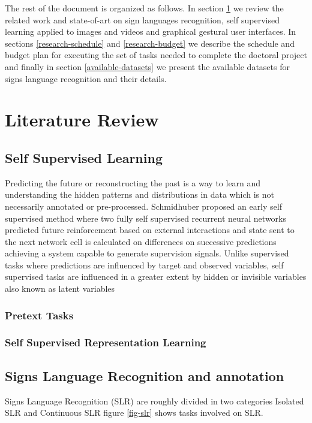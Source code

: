 The rest of the document is organized as follows. In section \ref{literature-review} we review the related work and state-of-art on sign languages recognition, self supervised learning applied to images and videos and graphical gestural user interfaces. In sections \ref{research-schedule} and \ref{research-budget} we describe the schedule and budget plan for executing the set of tasks needed to complete the doctoral project and finally in section \ref{available-datasets} we present the available datasets for signs language recognition and their details.


\section{Literature Review}\label{literature-review}
\subsection{Self Supervised Learning}
Predicting the future or reconstructing the past is a way to learn and understanding the hidden patterns and distributions in data which is not necessarily annotated or pre-processed. Schmidhuber proposed an early self supervised method \cite{schmidhuber1990making} where two fully self supervised recurrent neural networks predicted future reinforcement based on external interactions and state sent to the next network cell is calculated on differences on successive predictions achieving a system capable to generate supervision signals. Unlike supervised tasks where predictions are influenced by target and observed variables, self supervised tasks are influenced in a greater extent by hidden or invisible variables also known as latent variables


\subsubsection{Pretext Tasks}
\subsubsection{Self Supervised Representation Learning}
\subsection{Signs Language Recognition and annotation}
Signs Language Recognition (SLR) are roughly divided in two categories Isolated SLR and Continuous SLR\cite{adaloglou2020comprehensive} figure \ref{fig-slr} shows tasks involved on SLR.

